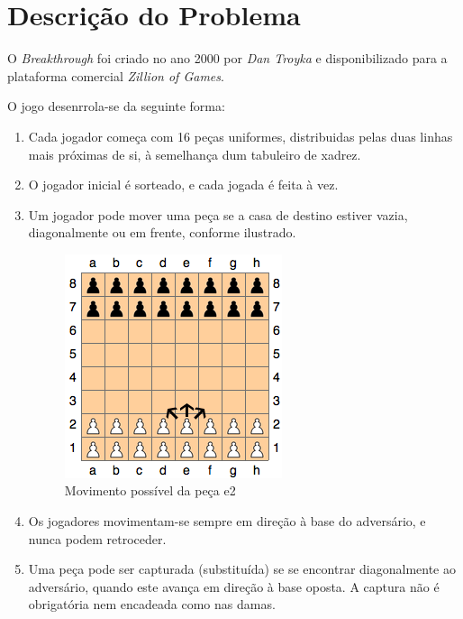 \documentclass[15pt,a4paper]{article}
\begin{document}
\newpage

\section{Descrição do Problema}

O \textit{Breakthrough} foi criado no ano 2000 por \textit{Dan Troyka}  e disponibilizado para a plataforma comercial \textit{Zillion of Games}.

O jogo desenrrola-se da seguinte forma:

\begin{enumerate}
\item Cada jogador começa com 16 peças uniformes, distribuidas pelas duas linhas mais próximas de si, à semelhança dum tabuleiro de xadrez.
\item O jogador inicial é sorteado, e cada jogada é feita à vez.
\item Um jogador pode mover uma peça se a casa de destino estiver vazia, diagonalmente ou em frente, conforme ilustrado.

\begin{figure}[h!]
\begin{center}
\includegraphics[scale=0.5]{fig1.png}
\caption{Movimento possível da peça e2}
\label{fig:1}
\end{center}
\end{figure}

\item Os jogadores movimentam-se sempre em direção à base do adversário, e nunca podem retroceder.
\item Uma peça pode ser capturada (substituída) se se encontrar diagonalmente ao adversário, quando este avança em direção à base oposta. A captura não é obrigatória nem encadeada como nas damas.


\end{enumerate}
\end{document}
